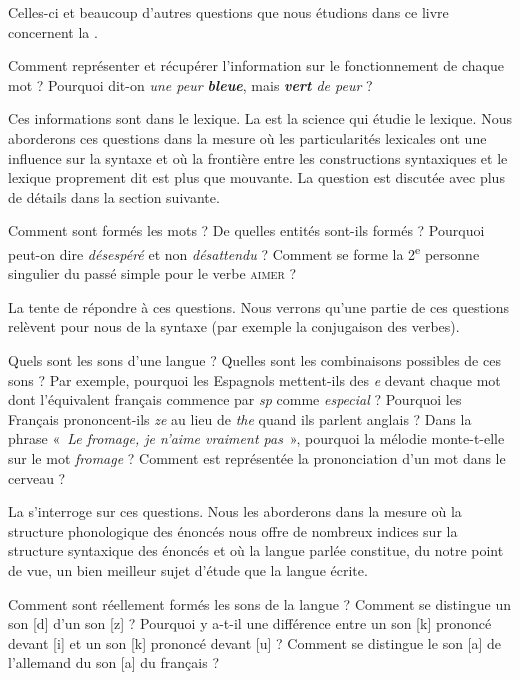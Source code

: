 {    Celles-ci et beaucoup d’autres questions que nous étudions dans ce livre concer\-nent la .

    Comment représenter et récupérer l’information sur le fonctionnement de chaque mot ? Pourquoi dit-on \textit{une peur \textbf{bleue}}, mais \textit{\textbf{vert} de peur} ?

    Ces informations sont dans le lexique. La  est la science qui étudie le lexique. Nous aborderons ces questions dans la mesure où les particularités lexicales ont une influence sur la syntaxe et où la frontière entre les constructions syntaxiques et le lexique proprement dit est plus que mouvante. La question est discutée avec plus de détails dans la section suivante.

    Comment sont formés les mots ? De quelles entités sont-ils formés ? Pourquoi peut-on dire \textit{désespéré} et non \textit{désattendu} ? Comment se forme la 2\textsuperscript{e} personne singulier du passé simple pour le verbe \textsc{aimer} ?

    La  tente de répondre à ces questions. Nous verrons qu’une partie de ces questions relèvent pour nous de la syntaxe (par exemple la conjugaison des verbes).

    Quels sont les sons d’une langue ? Quelles sont les combinaisons possibles de ces sons ? Par exemple, pourquoi les Espagnols mettent-ils des \textit{e} devant chaque mot dont l’équivalent français commence par \textit{sp} comme \textit{especial} ? Pourquoi les Français prononcent-ils \textit{ze} au lieu de \textit{the} quand ils parlent anglais ? Dans la phrase «~\textit{Le fromage, je n’aime vraiment pas}~», pourquoi la mélodie monte-t-elle sur le mot \textit{fromage} ? Comment est représentée la prononciation d’un mot dans le cerveau ?

    La  s’interroge sur ces questions. Nous les aborderons dans la mesure où la structure phonologique des énoncés nous offre de nombreux indices sur la structure syntaxique des énoncés et où la langue parlée constitue, du notre point de vue, un bien meilleur sujet d’étude que la langue écrite.

    Comment sont réellement formés les sons de la langue ? Comment se distingue un son [d] d’un son [z] ? Pourquoi y a-t-il une différence entre un son [k] prononcé devant [i] et un son [k] prononcé devant [u] ? Comment se distingue le son [a] de l’allemand du son [a] du français ?

}
